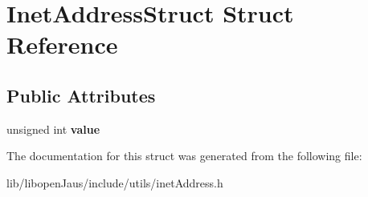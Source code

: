 \hypertarget{struct_inet_address_struct}{\section{\-Inet\-Address\-Struct \-Struct \-Reference}
\label{struct_inet_address_struct}
}
\subsection*{\-Public \-Attributes}
\begin{DoxyCompactItemize}
\item 
\hypertarget{struct_inet_address_struct_a37206140a084b482894a8fd2e78799da}{unsigned int {\bfseries value}}\label{struct_inet_address_struct_a37206140a084b482894a8fd2e78799da}

\end{DoxyCompactItemize}


\-The documentation for this struct was generated from the following file\-:\begin{DoxyCompactItemize}
\item 
lib/libopen\-Jaus/include/utils/inet\-Address.\-h\end{DoxyCompactItemize}
